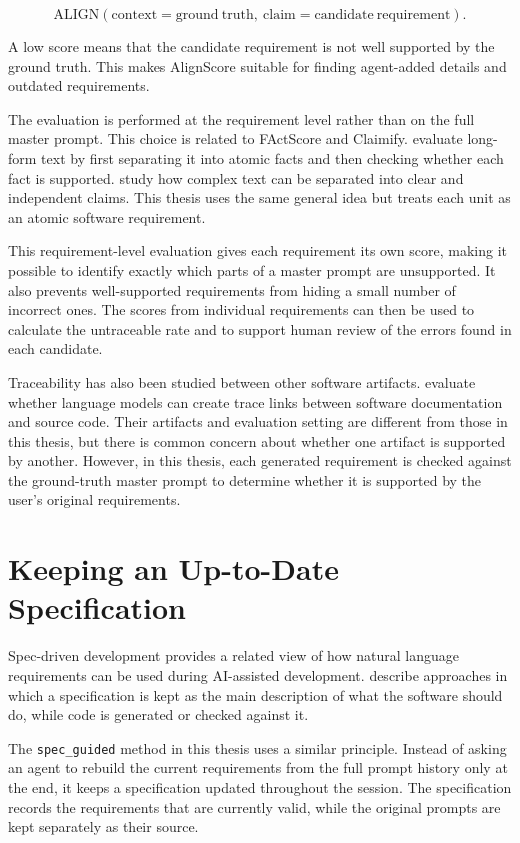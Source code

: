\[
\mathrm{ALIGN}
(\mathrm{context}=\mathrm{ground\ truth},\
\mathrm{claim}=\mathrm{candidate\ requirement}).
\]

A low score means that the candidate requirement is not well supported by the
ground truth. This makes AlignScore suitable for finding agent-added details
and outdated requirements.

The evaluation is performed at the requirement level rather than on the full
master prompt. This choice is related to FActScore and Claimify.
\citet{min2023factscore} evaluate long-form text by first separating it into
atomic facts and then checking whether each fact is supported.
\citet{metropolitansky2025claimify} study how complex text can be separated
into clear and independent claims. This thesis uses the same
general idea but treats each unit as an atomic software requirement.

This requirement-level evaluation gives each requirement its own score, making it
possible to identify exactly which parts of a master prompt are unsupported.
It also prevents well-supported requirements from hiding a small number of
incorrect ones. The scores from individual requirements
can then be used to calculate the untraceable rate and to support 
human review of the errors found in each candidate.

Traceability has also been studied between other software artifacts.
\citet{alor2025traceability} evaluate whether language models can create trace
links between software documentation and source code. Their artifacts and
evaluation setting are different from those in this thesis, but there is 
common concern about whether one artifact is supported by another.
However, in this thesis, each generated requirement is checked against
the ground-truth master prompt to determine whether 
it is supported by the user's original requirements.

\section{Keeping an Up-to-Date Specification}
\label{sec:related-spec}

Spec-driven development provides a related view of how natural language
requirements can be used during AI-assisted development. \citet{piskala2026specdriven} describe approaches in which a specification is
kept as the main description of what the software should do, while code is
generated or checked against it.

The \texttt{spec\_guided} method in this thesis uses a similar principle.
Instead of asking an agent to rebuild the current requirements from the full
prompt history only at the end, it keeps a specification updated throughout
the session. The specification records the requirements that are currently
valid, while the original prompts are kept separately as their source.

